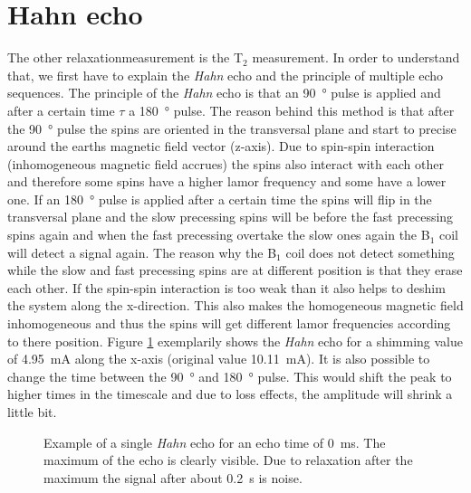 \section{Hahn echo}
\label{sec:Hahnecho}
The other relaxationmeasurement is the T$_2$ measurement. In order to understand that, we first have to explain the \textit{Hahn} echo and the principle of multiple echo sequences.\newline
The principle of the \textit{Hahn} echo is that an \SI{90}{\degree} pulse is applied and after a certain time $\tau$ a \SI{180}{\degree} pulse. The reason behind this method is that after the \SI{90}{\degree} pulse the spins are oriented in the transversal plane and start to precise around the earths magnetic field vector (z-axis). Due to spin-spin interaction (inhomogeneous magnetic field accrues) the spins also interact with each other and therefore some spins have a higher lamor frequency and some have a lower one. If an \SI{180}{\degree} pulse is applied after a certain time the spins will flip in the transversal plane and the slow precessing spins will be before the fast precessing spins again and when the fast precessing  overtake the slow ones again the B$_1$ coil will detect a signal again. The reason why the B$_1$ coil does not detect something while the slow and fast precessing spins are at different position is that they erase each other. If the spin-spin interaction is too weak than it also helps to deshim the system along the x-direction. This also makes the homogeneous magnetic field inhomogeneous and thus the spins will get different lamor frequencies according to there position.\newline
Figure \ref{fig:Echobeispeilsignal} exemplarily shows the \textit{Hahn} echo for a shimming value of \SI{4.95}{\milli \ampere} along the x-axis (original value \SI{10.11}{\milli \ampere}). It is also possible to change the time between the \SI{90}{\degree} and \SI{180}{\degree} pulse. This would shift the peak to higher times in the timescale and due to loss effects, the amplitude will shrink a little bit.
\begin{figure}[H]
    \centering
    
    \caption[Example of a single \textit{Hahn} echo for an echo time of \SI{0}{\milli \second}.]{Example of a single \textit{Hahn} echo for an echo time of \SI{0}{\milli \second}. The maximum of the echo is clearly visible. Due to relaxation after the maximum the signal after about \SI{0.2}{\second} is noise.}
    \label{fig:Echobeispeilsignal}
\end{figure}
